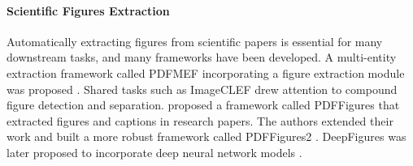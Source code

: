 \documentclass{article}
\begin{document}
\paragraph{Scientific Figures Extraction}
Automatically extracting figures from scientific papers is essential for many downstream tasks, and many frameworks have been developed. 
A multi-entity extraction framework called PDFMEF incorporating a figure extraction module was proposed \cite{Wu2015PDFMEFAM}. Shared tasks such as ImageCLEF \cite{Herrera2015OverviewOT} drew attention to compound figure detection %
and separation. %
\cite{Clark2015LookingBT} proposed a framework called {\sc PDFFigures} that extracted figures and captions in research papers. The authors extended their work and built a more robust framework called {\sc PDFFigures2} \cite{Clark2016PDFFigures2M}. {\sc DeepFigures} was later proposed to incorporate deep neural network models \cite{Siegel_2018}. 
\end{document}

